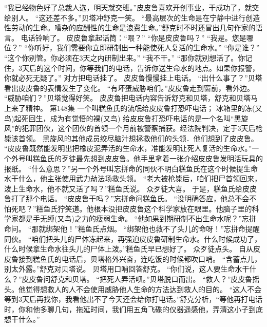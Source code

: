 \documentclass[a4paper,12pt,UTF8,twoside]{ctexbook}
\begin{document}
        “我已经物色好了总裁人选，明天就交班。”皮皮鲁喜欢开创事业，干成功了，就交给别人。 
        “这还差不多。”贝塔冲舒克一笑。 
        “最高层次的生命是在宁静中进行创造性劳动的生命。嘈杂的应酬性的生命是浪费生命。”舒克时不时还冒出几句作家的语言。 
        电话铃响了。 
        皮皮鲁拿起话筒：“喂？” 
        “你是皮皮鲁吗？” 
        “我是。您是哪位？” 
        “你听好，我们需要你立即研制出一种能使死人复活的生命水。” 
        “你是谁？” 
        “这个你别管。你必须在3天之内研制出来。” 
        “我不干。” 
        “那你就别想活了。你记住，3天后的这个时间，你等我们的电话，告诉你送生命水的地点。如果你报警，你就必死无疑了。” 
        对方把电话挂了。 
        皮皮鲁慢慢挂上电话。 
        “出什么事了？”贝塔看出皮皮鲁的表情发生了变化。 
        “有坏蛋威胁咱们。”皮皮鲁走到窗前，看外边。 
        “威胁咱们？”贝塔觉得好笑。 
        皮皮鲁把电话内容告诉舒克和贝塔，舒克和贝塔马上来了精神。   第148集 
        一个叫糕鱼氏的流氓给皮皮鲁打恐吓电话； 
        冰箱里的冻(又鸟)起死回生，成为有觉悟的裸(又鸟)       
        给皮皮鲁打恐吓电话的是一个名叫“黑旋风”的犯罪团伙，这个团伙的首领一个月前被警察捕获。经法院判决，定于3天后枪毙该首领。 
        黑旋风的其他成员绞尽脑汁想拯救他们的头领．他们想到了皮皮鲁。 
        “皮皮鲁既然能发明出把橡皮泥弄活的生命水，准能发明让死人复活的生命水。”一个外号叫糕鱼氏的歹徒最先想到皮皮鲁。他手里拿着一张介绍皮皮鲁发明活玩具的报纸。 
        “什么意思？”另一个外号叫忘拼命的同伙不明白糕鱼氏在这个时候提生命水干什么，他主张使用武力劫法场救头领。 
        “老大被枪毙后，咱们把尸首领回来，泼上生命水，他不就又活了吗？”糕鱼氏说。 
        众歹徒大喜。 
        于是，糕鱼氏给皮皮鲁打了那个电话。 
        “皮皮鲁干吗？”忘拼命问糕鱼氏。 
        “没明确答应，他总不会不怕死吧？”糕鱼氏狞笑道。他根本没把皮皮鲁这个科学家放在眼里。他脑子里的科学家都是手无缚(又鸟)之力的瘦弱生命。 
        “他如果到期研制不出生命水呢？”忘拼命问。 
        “那就绑架他！”糕鱼氏点烟。 
        “绑架他也救不了头儿的命呀！”忘拼命提醒同伙。 
        “咱们把头儿的尸体冻起来，再强迫皮皮鲁研制生命水。什么时候成功了，什么时候拿生命水往头儿的尸体上泼。”糕鱼氏早已想好了。 
        众歹徒点头。 
        自从皮皮鲁接到糕鱼氏的电话后，贝塔格外兴奋，连吃饭的时候都吹口哨。 
        “含蓄点儿，别太外露。”舒克对贝塔说。 
        贝塔用口哨回答舒克。 
        “你们说，这人要生命水干什么？”皮皮鲁问舒克和贝塔。 
        “把死人弄活呗。”贝塔脱口而出。 
        “救人？”皮皮鲁摇头。他觉得想救人的人不会使用威胁他人生命的方法达到救人的目的。 
        “这人不会等到3天后再找你，我看他出不了今天还会给你打电话。”舒克分析，“等他再打电话时，你和他多聊几句，拖延时间，我们用五角飞碟的仪器遥感他，弄清这小子到底想干什么。” 
\end{document}
